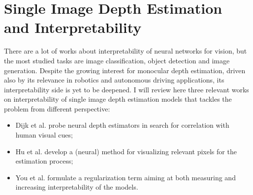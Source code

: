 \section{Single Image Depth Estimation and Interpretability}
There are a lot of works about interpretability of neural networks for vision, but the most studied tasks are image classification, object detection and image generation.
Despite the growing interest for monocular depth estimation, driven also by its relevance in robotics and autonomous driving applications, its interpretability side is yet to be deepened.
I will review here three relevant works on interpretability of single image depth estimation models that tackles the problem from different perspective:
\begin{itemize}
    \item{Dijk et al. \cite{Dijk} probe neural depth estimators in search for correlation with human visual cues;}
    \item{Hu et al. \cite{Hu} develop a (neural) method for visualizing relevant pixels for the estimation process;}
    \item{You et al. \cite{towards_interpretable} formulate a regularization term aiming at both measuring and increasing interpretability of the models.}
\end{itemize}

